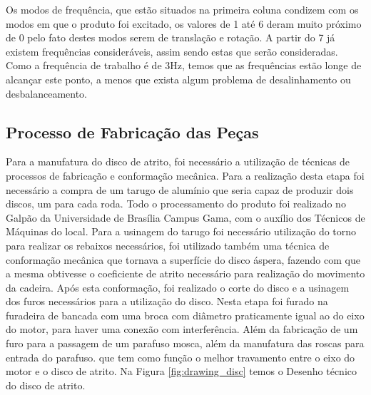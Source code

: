 Os modos de frequência, que estão situados na primeira coluna condizem com os
modos em que o produto foi excitado, os valores de 1 até 6 deram muito próximo
de 0 pelo fato destes modos serem de translação e rotação. A partir do 7 já
existem frequências consideráveis, assim sendo estas que serão consideradas.
Como a frequência de trabalho é de 3Hz, temos que as frequências estão longe de
alcançar este ponto, a menos que exista algum problema de desalinhamento ou
desbalanceamento.

\subsection{Processo de Fabricação das Peças}

Para a manufatura do disco de atrito, foi necessário a utilização de técnicas de
processos de fabricação e conformação mecânica. Para a realização desta etapa
foi necessário a compra de um tarugo de alumínio que seria capaz de produzir
dois discos, um para cada roda. Todo o processamento do produto foi realizado
no Galpão da Universidade de Brasília Campus Gama, com o auxílio dos Técnicos
de Máquinas do local. Para a usinagem do tarugo foi necessário utilização do
torno para realizar os rebaixos necessários, foi utilizado também  uma técnica
de conformação mecânica que tornava a superfície do disco áspera, fazendo com
que a mesma obtivesse o coeficiente de atrito necessário para realização do
movimento da cadeira. Após esta conformação, foi realizado o corte do disco e a
usinagem dos furos necessários para a utilização do disco. Nesta etapa foi
furado na furadeira de bancada com uma broca com diâmetro praticamente igual ao
do eixo do motor, para haver uma conexão com interferência. Além da fabricação
de um furo para a passagem de um parafuso mosca, além da manufatura das roscas
para entrada do parafuso. que tem como função o melhor travamento entre o eixo
do motor e o disco de atrito. Na Figura \ref{fig:drawing_disc} temos o Desenho técnico do disco de
atrito.

